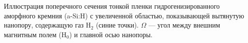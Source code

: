 Иллюстрация поперечного сечения тонкой пленки гидрогенизированного аморфного кремния (a-Si:H) с увеличенной областью,
показывающей вытянутую нанопору,
содержащую газ H$_2$ (синие точки).
$\Omega$ --- угол между внешним магнитным полем (H$_0$) и главной осью нанопоры.
